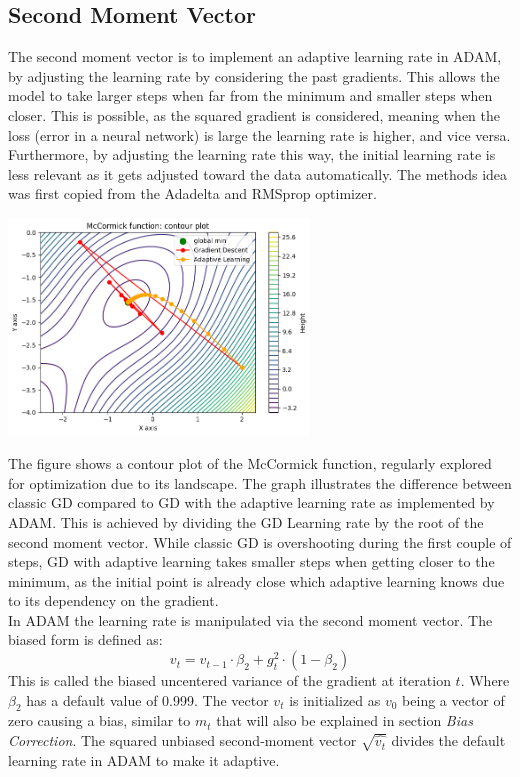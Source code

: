 \documentclass[oneside]{article}
\begin{document}
\subsection{Second Moment Vector}
The second moment vector is to implement an adaptive learning rate in ADAM, by adjusting the learning rate by considering the past gradients. This allows the model to take larger steps when far from the minimum and smaller steps when closer. This is possible, as the squared gradient is considered, meaning when the loss (error in a neural network) is large the learning rate is higher, and vice versa. Furthermore, by adjusting the learning rate this way, the initial learning rate is less relevant as it gets adjusted toward the data automatically. The methods idea was first copied from the Adadelta and RMSprop optimizer.\\
\begin{center}
    \includegraphics[width=0.6\textwidth]{report/figures/GD_rmsprop.png}\\
\end{center}
The figure shows a contour plot of the McCormick function, regularly explored for optimization due to its landscape. The graph illustrates the difference between classic GD compared to GD with the adaptive learning rate as implemented by ADAM. This is achieved by dividing the GD Learning rate by the root of the second moment vector. While classic GD is overshooting during the first couple of steps, GD with adaptive learning takes smaller steps when getting closer to the minimum, as the initial point is already close which adaptive learning knows due to its dependency on the gradient.\\
In ADAM the learning rate is manipulated via the second moment vector. The biased form is defined as:
$$v_t = v_{t-1} \cdot \beta_2 + g_t^2 \cdot (1-\beta_2)$$
This is called the biased uncentered variance of the gradient at iteration $t$. Where $\beta_2$ has a default value of 0.999. The vector $v_t$ is initialized as $v_0$ being a vector of zero causing a bias, similar to $m_t$ that will also be explained in section \textit{Bias Correction}. The squared unbiased second-moment vector $\sqrt{\hat{v_t}}$ divides the default learning rate in ADAM to make it adaptive.\\
\end{document}
